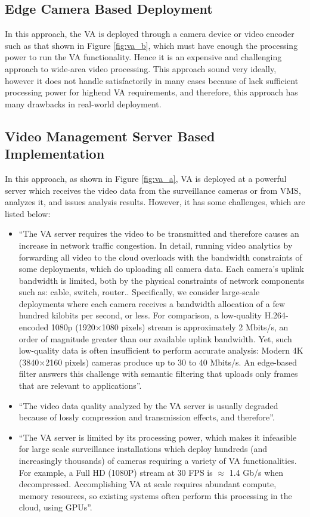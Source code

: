 \subsection{Edge Camera Based Deployment}
In this approach, the VA is deployed through a  camera device or video encoder \cite{chen2017smart} such as that shown in Figure \ref{fig:va_b}, which must have enough the processing power to run the VA functionality. Hence it is an expensive and challenging approach to wide-area video processing. This approach sound very ideally, however it does not handle satisfactorily in many cases because of lack sufficient processing power for highend VA requirements, and therefore, this approach has many drawbacks in real-world deployment. 
\subsection{Video Management Server Based Implementation}
In this approach, as shown in Figure \ref{fig:va_a}, VA is deployed at a powerful server which receives the video data from the surveillance cameras or from VMS, analyzes it, and issues analysis results. However, it has some challenges, which are listed below:
\begin{itemize}
\item “The VA server requires the video to be transmitted and therefore causes an increase in network traffic congestion. In detail, running video analytics by forwarding all video to the cloud overloads with the bandwidth constraints of some deployments, which do uploading all camera data. Each camera’s uplink bandwidth is limited, both by the physical constraints of network components such as: cable, switch, router.. Specifically, we consider large-scale deployments where each camera receives a bandwidth allocation of a few hundred kilobits per second, or less. For comparison, a low-quality H.264-encoded 1080p (1920×1080 pixels) stream is approximately 2 Mbits/s, an order of magnitude greater than our available uplink bandwidth. Yet, such low-quality data is often insufficient to perform accurate analysis: Modern 4K (3840×2160 pixels) cameras produce up to 30 to 40 Mbits/s. An edge-based filter answers this challenge with semantic filtering that uploads only frames that are relevant to applications”.
\item “The video data quality analyzed by the VA server is usually degraded because of lossly compression and transmission effects, and therefore”.
\item “The VA server is limited by its processing power, which makes it infeasible for large scale surveillance installations which deploy hundreds (and increasingly thousands) of cameras requiring a variety of VA functionalities. For example, a Full HD (1080P) stream at 30 FPS is $\approx$ 1.4 Gb/s when decompressed. Accomplishing VA at scale requires abundant compute, memory resources, so existing systems often perform this processing in the cloud, using GPUs”.
\end{itemize}

